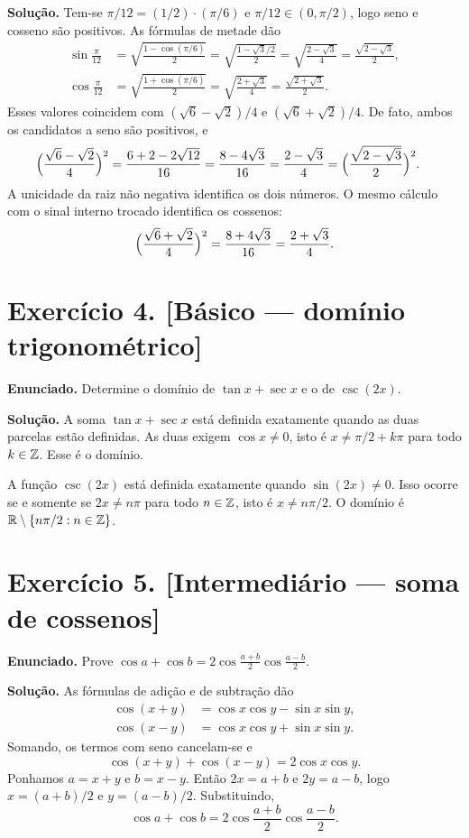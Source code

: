 \documentclass[11pt,a4paper]{article}
\begin{document}
\textbf{Solução.}
Tem-se $\pi/12=(1/2)\cdot(\pi/6)$ e $\pi/12\in(0,\pi/2)$, logo seno e cosseno são positivos. As fórmulas de metade dão
\begin{align*}
\sin\frac{\pi}{12}
&=\sqrt{\frac{1-\cos(\pi/6)}{2}}
=\sqrt{\frac{1-\sqrt{3}/2}{2}}
=\sqrt{\frac{2-\sqrt{3}}{4}}
=\frac{\sqrt{2-\sqrt{3}}}{2},\\[0.4em]
\cos\frac{\pi}{12}
&=\sqrt{\frac{1+\cos(\pi/6)}{2}}
=\sqrt{\frac{2+\sqrt{3}}{4}}
=\frac{\sqrt{2+\sqrt{3}}}{2}.
\end{align*}
Esses valores coincidem com $(\sqrt{6}-\sqrt{2})/4$ e $(\sqrt{6}+\sqrt{2})/4$. De fato, ambos os candidatos a seno são positivos, e
\begin{align*}
\Bigl(\frac{\sqrt{6}-\sqrt{2}}{4}\Bigr)^2
&=\frac{6+2-2\sqrt{12}}{16}
=\frac{8-4\sqrt{3}}{16}
=\frac{2-\sqrt{3}}{4}
=\Bigl(\frac{\sqrt{2-\sqrt{3}}}{2}\Bigr)^2.
\end{align*}
A unicidade da raiz não negativa identifica os dois números. O mesmo cálculo com o sinal interno trocado identifica os cossenos:
\[
\Bigl(\frac{\sqrt{6}+\sqrt{2}}{4}\Bigr)^2=\frac{8+4\sqrt{3}}{16}=\frac{2+\sqrt{3}}{4}.
\]

\section*{Exercício 4. [Básico --- domínio trigonométrico]}

\textbf{Enunciado.} Determine o domínio de $\tan x+\sec x$ e o de $\csc(2x)$.

\textbf{Solução.}
A soma $\tan x+\sec x$ está definida exatamente quando as duas parcelas estão definidas. As duas exigem $\cos x\neq 0$, isto é $x\neq \pi/2+k\pi$ para todo $k\in\mathbb{Z}$. Esse é o domínio.

A função $\csc(2x)$ está definida exatamente quando $\sin(2x)\neq 0$. Isso ocorre se e somente se $2x\neq n\pi$ para todo $n\in\mathbb{Z}$, isto é $x\neq n\pi/2$. O domínio é $\mathbb{R}\setminus\{n\pi/2:n\in\mathbb{Z}\}$.

\section*{Exercício 5. [Intermediário --- soma de cossenos]}

\textbf{Enunciado.} Prove $\cos a+\cos b=2\cos\frac{a+b}{2}\cos\frac{a-b}{2}$.

\textbf{Solução.}
As fórmulas de adição e de subtração dão
\begin{align*}
\cos(x+y)&=\cos x\cos y-\sin x\sin y,\\
\cos(x-y)&=\cos x\cos y+\sin x\sin y.
\end{align*}
Somando, os termos com seno cancelam-se e
\[
\cos(x+y)+\cos(x-y)=2\cos x\cos y.
\]
Ponhamos $a=x+y$ e $b=x-y$. Então $2x=a+b$ e $2y=a-b$, logo $x=(a+b)/2$ e $y=(a-b)/2$. Substituindo,
\[
\cos a+\cos b=2\cos\frac{a+b}{2}\cos\frac{a-b}{2}.
\]
\end{document}
